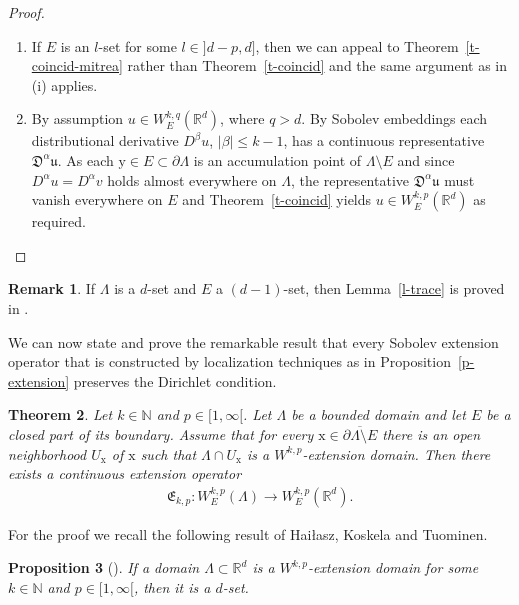 \documentclass[10pt,leqno]{amsart}
\newtheorem{theorem}{Theorem}[section]
\newtheorem{proposition}[theorem]{Proposition}
\theoremstyle{definition}
\newtheorem{remark}[theorem]{Remark}
\numberwithin{equation}{section}
\begin{document}
\begin{proof}
\begin{enumerate}
\item If $E$ is an $l$-set for some $l \in {]d-p,d]}$, then we can appeal to
  Theorem~\ref{t-coincid-mitrea} rather than Theorem~\ref{t-coincid} and the
  same argument as in (i) applies.

\item By assumption $u \in W_E^{k,q}({{\mathbb R}}^d)$, where $q > d$. By Sobolev
  embeddings each distributional derivative $D^\beta u$, $|\beta| \leq
  k-1$, has a continuous representative $\mathfrak{D}^\alpha {{\mathfrak u}}$. As each ${{\mathrm y}}
  \in E \subset \partial \Lambda$ is an accumulation point of $\Lambda \setminus
  E$ and since $D^\alpha u = D^\alpha v$ holds almost everywhere on $\Lambda$,
  the representative $\mathfrak{D}^\alpha {{\mathfrak u}}$ must vanish everywhere on $E$ and
  Theorem~\ref{t-coincid} yields $u \in W_E^{k,p}({{\mathbb R}}^d)$ as required.
  \qedhere
\end{enumerate}
\end{proof}

\begin{remark} \label{r-trace}
If $\Lambda$ is a $d$-set and $E$ a $(d-1)$-set, then Lemma~\ref{l-trace} is
proved in \cite[Sec.~VIII.1]{jons}.
\end{remark}

We can now state and prove the remarkable result that every Sobolev extension
operator that is constructed by localization techniques as
in Proposition~\ref{p-extension} preserves the Dirichlet condition.

\begin{theorem}\label{t-extension always preserves trace}
Let $k \in {{\mathbb N}}$ and $p \in [1,\infty[$. Let $\Lambda$ be a bounded domain and
let $E$ be a closed part of its boundary. Assume that for every ${{\mathrm x}} \in
\overline{\partial \Lambda \setminus E}$ there is an open neighborhood $U_{{\mathrm x}}$ of
$ {{\mathrm x}}$ such that $\Lambda \cap U_{{\mathrm x}}$ is a $W^{k,p}$-extension domain. Then
there exists a continuous extension operator
 \begin{align*}
  \mathfrak{E}_{k,p}: W^{k,p}_E(\Lambda) \to W_E^{k,p}({{\mathbb R}}^d).
 \end{align*}
\end{theorem}

For the proof we recall the following result of Hai\l{}asz, Koskela
and Tuominen.

\begin{proposition}[{\cite[Thm.\ 2]{hajla}}]\label{p-extension implies dset}
If a domain $\Lambda \subset {{\mathbb R}}^d$ is a $W^{k,p}$-extension domain for some $k
\in {{\mathbb N}}$ and $p \in {[1,\infty[}$, then it is a $d$-set.
\end{proposition}
\end{document}

